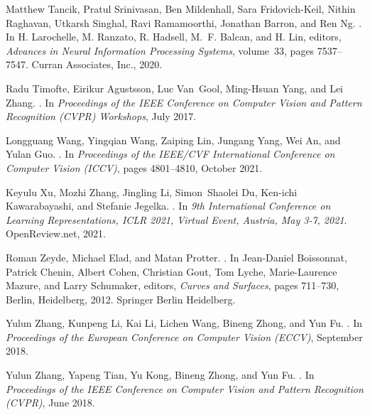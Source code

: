 \documentclass[10pt,twocolumn,letterpaper]{article}
\begin{document}
{\begin{thebibliography}{10}
Matthew Tancik, Pratul Srinivasan, Ben Mildenhall, Sara Fridovich-Keil, Nithin
  Raghavan, Utkarsh Singhal, Ravi Ramamoorthi, Jonathan Barron, and Ren Ng.
.
\newblock In H. Larochelle, M. Ranzato, R. Hadsell, M.~F. Balcan, and H. Lin,
  editors, {\em Advances in Neural Information Processing Systems}, volume~33,
  pages 7537--7547. Curran Associates, Inc., 2020.

Radu Timofte, Eirikur Agustsson, Luc Van~Gool, Ming-Hsuan Yang, and Lei Zhang.
.
\newblock In {\em Proceedings of the IEEE Conference on Computer Vision and
  Pattern Recognition (CVPR) Workshops}, July 2017.

Longguang Wang, Yingqian Wang, Zaiping Lin, Jungang Yang, Wei An, and Yulan
  Guo.
.
\newblock In {\em Proceedings of the IEEE/CVF International Conference on
  Computer Vision (ICCV)}, pages 4801--4810, October 2021.

Keyulu Xu, Mozhi Zhang, Jingling Li, Simon~Shaolei Du, Ken{-}ichi
  Kawarabayashi, and Stefanie Jegelka.
.
\newblock In {\em 9th International Conference on Learning Representations,
  {ICLR} 2021, Virtual Event, Austria, May 3-7, 2021}. OpenReview.net, 2021.

Roman Zeyde, Michael Elad, and Matan Protter.
.
\newblock In Jean-Daniel Boissonnat, Patrick Chenin, Albert Cohen, Christian
  Gout, Tom Lyche, Marie-Laurence Mazure, and Larry Schumaker, editors, {\em
  Curves and Surfaces}, pages 711--730, Berlin, Heidelberg, 2012. Springer
  Berlin Heidelberg.

Yulun Zhang, Kunpeng Li, Kai Li, Lichen Wang, Bineng Zhong, and Yun Fu.
.
\newblock In {\em Proceedings of the European Conference on Computer Vision
  (ECCV)}, September 2018.

Yulun Zhang, Yapeng Tian, Yu Kong, Bineng Zhong, and Yun Fu.
.
\newblock In {\em Proceedings of the IEEE Conference on Computer Vision and
  Pattern Recognition (CVPR)}, June 2018.

\end{thebibliography}

}
\end{document}
